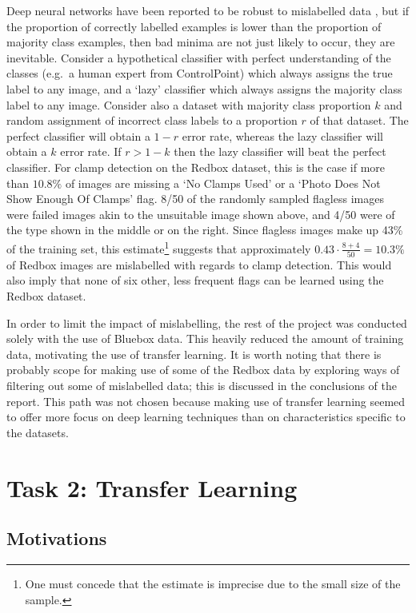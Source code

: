 \documentclass[a4paper,11pt]{article}
\begin{document}
Deep neural networks have been reported to be robust to mislabelled data \cite{DL-book}, but if the proportion of correctly labelled examples is lower than the proportion of majority class examples, then bad minima are not just likely to occur, they are inevitable. Consider a hypothetical classifier with perfect understanding of the classes (e.g.\ a human expert from ControlPoint) which always assigns the true label to any image, and a `lazy' classifier which always assigns the majority class label to any image. Consider also a dataset with majority class proportion $k$ and random assignment of incorrect class labels to a proportion $r$ of that dataset. The perfect classifier will obtain a $1-r$ error rate, whereas the lazy classifier will obtain a $k$ error rate. If $r > 1-k$ then the lazy classifier will beat the perfect classifier. For clamp detection on the Redbox dataset, this is the case if more than $10.8\%$ of images are missing a `No Clamps Used' or a `Photo Does Not Show Enough Of Clamps' flag. 8/50 of the randomly sampled flagless images were failed images akin to the unsuitable image shown above, and 4/50 were of the type shown in the middle or on the right. Since flagless images make up 43\% of the training set, this estimate\footnote{One must concede that the estimate is imprecise due to the small size of the sample.} suggests that approximately $0.43\cdot\frac{8+4}{50} = 10.3\%$ of Redbox images are mislabelled with regards to clamp detection. This would also imply that none of six other, less frequent flags can be learned using the Redbox dataset.

In order to limit the impact of mislabelling, the rest of the project was conducted solely with the use of Bluebox data. This heavily reduced the amount of training data, motivating the use of transfer learning. It is worth noting that there is probably scope for making use of some of the Redbox data by exploring ways of filtering out some of mislabelled data; this is discussed in the conclusions of the report. This path was not chosen because making use of transfer learning seemed to offer more focus on deep learning techniques than on characteristics specific to the datasets.


\clearpage
\section{Task 2: Transfer Learning}

\subsection{Motivations}
\end{document}
